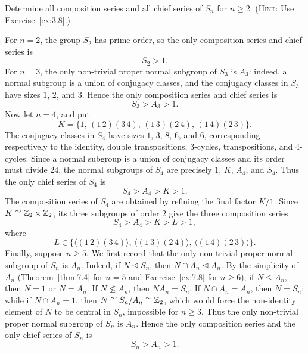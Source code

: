\documentclass[../Odyssey_Project.tex]{subfiles}
\begin{document}
\begin{exercise}
\label{ex:10.5}
Determine all composition series and all chief series of $S_n$ for $n \geq 2$. (\textsc{Hint}: Use Exercise~\ref{ex:3.8}.)
\end{exercise}
\begin{solution}
For $n=2$, the group $S_2$ has prime order, so the only composition series and chief series is
\[
  S_2>1.
\]
For $n=3$, the only non-trivial proper normal subgroup of $S_3$ is $A_3$: indeed, a normal subgroup is a union of conjugacy classes, and the conjugacy classes in $S_3$ have sizes $1$, $2$, and $3$. Hence the only composition series and chief series is
\[
  S_3>A_3>1.
\]
Now let $n=4$, and put
\[
  K=\{1,\,(1\,2)(3\,4),\,(1\,3)(2\,4),\,(1\,4)(2\,3)\}.
\]
The conjugacy classes in $S_4$ have sizes $1$, $3$, $8$, $6$, and $6$, corresponding respectively to the identity, double transpositions, $3$-cycles, transpositions, and $4$-cycles. Since a normal subgroup is a union of conjugacy classes and its order must divide $24$, the normal subgroups of $S_4$ are precisely $1$, $K$, $A_4$, and $S_4$. Thus the only chief series of $S_4$ is
\[
  S_4>A_4>K>1.
\]
The composition series of $S_4$ are obtained by refining the final factor $K/1$. Since $K\cong \mathbb{Z}_2\times\mathbb{Z}_2$, its three subgroups of order $2$ give the three composition series
\[
  S_4>A_4>K>L>1,
\]
where
\[
  L\in
  \{\langle(1\,2)(3\,4)\rangle,\,
  \langle(1\,3)(2\,4)\rangle,\,
  \langle(1\,4)(2\,3)\rangle\}.
\]
Finally, suppose $n\geq 5$. We first record that the only non-trivial proper normal subgroup of $S_n$ is $A_n$. Indeed, if $N\trianglelefteq S_n$, then $N\cap A_n\trianglelefteq A_n$. By the simplicity of $A_n$ (Theorem~\ref{thm:7.4} for $n=5$ and Exercise~\ref{ex:7.8} for $n\geq 6$), if $N\leq A_n$, then $N=1$ or $N=A_n$. If $N\nleq A_n$, then $NA_n=S_n$. If $N\cap A_n=A_n$, then $N=S_n$; while if $N\cap A_n=1$, then $N\cong S_n/A_n\cong \mathbb{Z}_2$, which would force the non-identity element of $N$ to be central in $S_n$, impossible for $n\geq 3$. Thus the only non-trivial proper normal subgroup of $S_n$ is $A_n$. Hence the only composition series and the only chief series of $S_n$ is
\[
  S_n>A_n>1.
\]
\end{solution}
\end{document}
